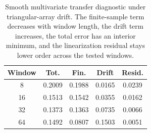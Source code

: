 \begin{table}[!htbp]
\centering
\small
\begin{tabular}{ccccc}
\toprule
Window & Tot. & Fin. & Drift & Resid. \\
\midrule
8  & 0.2009 & 0.1988 & 0.0165 & 0.0239 \\
16 & 0.1513 & 0.1542 & 0.0355 & 0.0162 \\
32 & 0.1373 & 0.1363 & 0.0735 & 0.0066 \\
64 & 0.1492 & 0.0807 & 0.1503 & 0.0051 \\
\bottomrule
\end{tabular}
\caption{Smooth multivariate transfer diagnostic under triangular-array drift. The finite-sample term decreases with window length, the drift term increases, the total error has an interior minimum, and the linearization residual stays lower order across the tested windows.}
\label{tab:multivariate_transfer_diagnostic}
\end{table}
